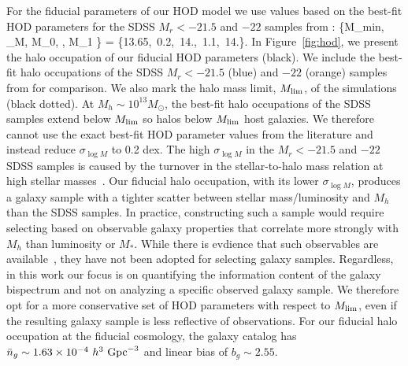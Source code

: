 For the fiducial parameters of our HOD model we use values based on the 
best-fit HOD parameters for the SDSS $M_r < -21.5$  and $-22$ samples from \cite{zheng2007}: 
\beq \label{eq:hod_fid}
\{M_{\rm min}, \sigma_{\log M}, \log M_0, \alpha, \log M_1 \} = \{13.65,~0.2,~14.,~1.1,~14.\}.
\eeq
In Figure~\ref{fig:hod}, we present the halo occupation of our fiducial 
HOD parameters (black). We include the best-fit halo occupations of 
the SDSS $M_r < -21.5$ (blue)  and $-22$ (orange) samples from \cite{zheng2007}
for comparison. We also mark the halo mass limit, $M_{\rm lim}$, of the \quij 
simulations (black dotted). At $M_h \sim 10^{13} M_\odot$, the best-fit halo 
occupations of the SDSS samples extend below $M_{\rm lim}$ so halos below
$M_{\rm lim}$ host galaxies. We therefore cannot use the exact best-fit HOD
parameter values from the literature and instead reduce $\sigma_{\log M}$ to 0.2 dex.
The high $\sigma_{\log M}$ in the $M_r < -21.5$ and $-22$ SDSS samples is
caused by the turnover in the stellar-to-halo mass relation at high stellar
masses~\citep{mandelbaum2006a, conroy2007, more2011, leauthaud2012, tinker2013,
zu2015, hahn2019a}. Our fiducial halo occupation, with its lower $\sigma_{\log
M}$, produces a galaxy sample with a tighter scatter between stellar
mass/luminosity and $M_h$ than the SDSS samples.  %
In practice, constructing such a sample would require selecting based on
observable galaxy properties that correlate more strongly with $M_h$ than 
luminosity or $M_*$. While there is evdience that such observables are 
available~\citep[\eg~$L_{\rm sat}$; ][]{alpaslan2019}, they have not been
adopted for selecting galaxy samples. Regardless, in this work
our focus is on quantifying the information content of the galaxy bispectrum 
and not on analyzing a specific observed galaxy sample. We therefore opt for 
a more conservative set of HOD parameters with respect to $M_{\rm lim}$, even
if the resulting galaxy sample is less reflective of observations. For our
fiducial halo occupation at the fiducial cosmology, the galaxy catalog has 
$\bar{n}_g \sim 1.63\times 10^{-4}~h^3~{\rm Gpc}^{-3}$ and linear bias of 
$b_g \sim 2.55$.

